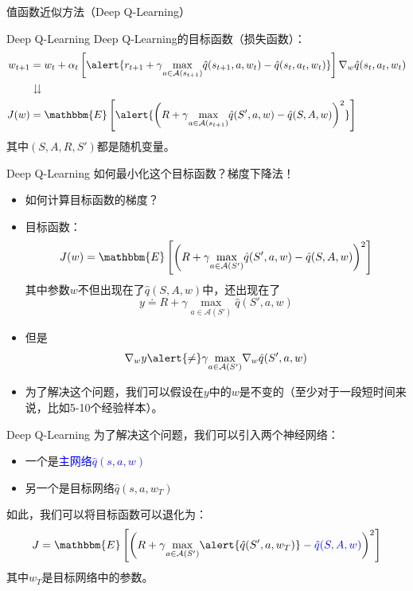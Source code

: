 \begin{section}{值函数近似方法\alert{（Deep Q-Learning）}}
\begin{frame}{Deep Q-Learning}
    Deep Q-Learning的目标函数（损失函数）：
    \[
        \begin{aligned}
            w_{t+1}&=w_t+\alpha_t\left[\alert{r_{t+1}+\gamma \underset{a\in \mathcal{A}(s_{t+1})}{\max}\hat{q}(s_{t+1},a,w_t)-\hat{q}(s_t,a_t,w_t)}\right]\nabla_w\hat{q}(s_t,a_t,w_t)\\
            &\downdownarrows \\
            J(w)&=\mathbbm{E}\left[\alert{\left(R+\gamma \underset{a\in \mathcal{A}(s_{t+1})}{\max}\hat{q}(S',a,w)-\hat{q}(S,A,w)\right)^2}\right]\\
        \end{aligned}
    \]
    其中$(S,A,R,S')$都是随机变量。
\end{frame}

\begin{frame}{Deep Q-Learning}
    如何最小化这个目标函数？梯度下降法！
    \begin{itemize}
        \item 如何计算目标函数的梯度？
        \item 目标函数：
        \[
            J(w)=\mathbbm{E}\left[\left(R+\gamma \underset{a\in \mathcal{A}(S')}{\max}\hat{q}(S',a,w)-\hat{q}(S,A,w)\right)^2\right]
        \]
        其中参数$w$不但出现在了$\hat{q}(S,A,w)$中，还出现在了
        \[
            y\doteq R+\gamma\underset{a\in \mathcal{A}(S')}{\max}\hat{q}(S',a,w)
        \]
        \item 但是
        \[
            \nabla_wy\alert{\neq} \gamma\underset{a\in \mathcal{A}(S')}{\max}\nabla_w\hat{q}(S',a,w)
        \]
        \item 为了解决这个问题，我们可以假设在$y$中的$w$是不变的（至少对于一段短时间来说，比如5-10个经验样本）。
    \end{itemize}
\end{frame}

\begin{frame}{Deep Q-Learning}
    为了解决这个问题，我们可以引入两个神经网络：
    \begin{itemize}
        \item 一个是\textcolor{blue}{主网络$\hat{q}(s,a,w)$}
        \item 另一个是\alert{目标网络$\hat{q}(s,a,w_T)$}
    \end{itemize}
    如此，我们可以将目标函数可以退化为：
    \[
        J=\mathbbm{E}\left[\left(R+\gamma \underset{a\in \mathcal{A}(S')}{\max}\alert{\hat{q}(S',a,w_T)}-\textcolor{blue}{\hat{q}(S,A,w)}\right)^2\right]
    \]
    其中$w_T$是目标网络中的参数。


\end{frame}
\end{section}
